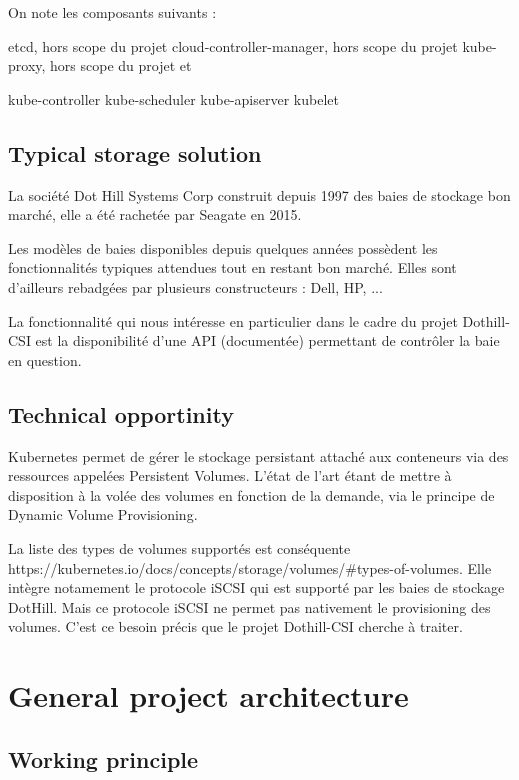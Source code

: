 On note les composants suivants :

etcd, hors scope du projet
cloud-controller-manager, hors scope du projet
kube-proxy, hors scope du projet
et

kube-controller
kube-scheduler
kube-apiserver
kubelet
\color{black}

\subsection{Typical storage solution}

\color{darkgreen}
La société Dot Hill Systems Corp construit depuis 1997 des baies de stockage bon marché, elle a été rachetée par Seagate en 2015.

Les modèles de baies disponibles depuis quelques années possèdent les fonctionnalités typiques attendues tout en restant bon marché. Elles sont d'ailleurs rebadgées par plusieurs constructeurs : Dell, HP, ...

La fonctionnalité qui nous intéresse en particulier dans le cadre du projet Dothill-CSI est la disponibilité d'une API (documentée) permettant de contrôler la baie en question.
\color{black}

\subsection{Technical opportinity}

\color{darkgreen}
Kubernetes permet de gérer le stockage persistant attaché aux conteneurs via des ressources appelées Persistent Volumes. L'état de l'art étant de mettre à disposition à la volée des volumes en fonction de la demande, via le principe de Dynamic Volume Provisioning.

La liste des types de volumes supportés est conséquente https://kubernetes.io/docs/concepts/storage/volumes/\#types-of-volumes. Elle intègre notamement le protocole iSCSI qui est supporté par les baies de stockage DotHill. Mais ce protocole iSCSI ne permet pas nativement le provisioning des volumes. C'est ce besoin précis que le projet Dothill-CSI cherche à traiter.
\color{black}

\section{General project architecture}

\subsection{Working principle}

